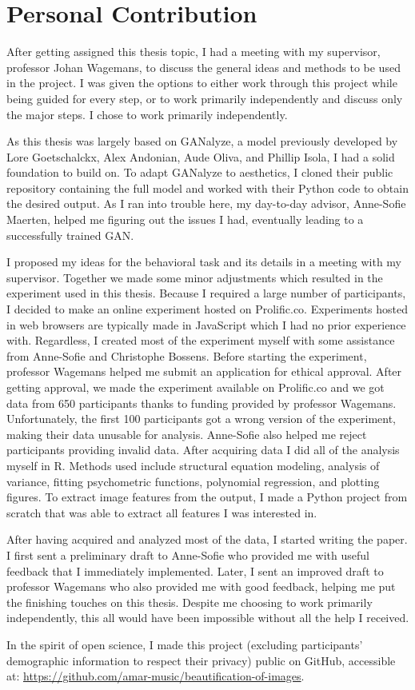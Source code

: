\documentclass[../main.tex]{subfiles}
\begin{document}
\newpage
\section{Personal Contribution}
After getting assigned this thesis topic, I had a meeting with my supervisor, professor Johan Wagemans, to discuss the general ideas and methods to be used in the project. I was given the options to either work through this project while being guided for every step, or to work primarily independently and discuss only the major steps. I chose to work primarily independently.

As this thesis was largely based on GANalyze, a model previously developed by Lore Goetschalckx, Alex Andonian, Aude Oliva, and Phillip Isola, I had a solid foundation to build on. To adapt GANalyze to aesthetics, I cloned their public repository containing the full model and worked with their Python code to obtain the desired output. As I ran into trouble here, my day-to-day advisor, Anne-Sofie Maerten, helped me figuring out the issues I had, eventually leading to a successfully trained GAN.

I proposed my ideas for the behavioral task and its details in a meeting with my supervisor. Together we made some minor adjustments which resulted in the experiment used in this thesis. Because I required a large number of participants, I decided to make an online experiment hosted on Prolific.co. Experiments hosted in web browsers are typically made in JavaScript which I had no prior experience with. Regardless, I created most of the experiment myself with some assistance from Anne-Sofie and Christophe Bossens. Before starting the experiment, professor Wagemans helped me submit an application for ethical approval. After getting approval, we made the experiment available on Prolific.co and we got data from 650 participants thanks to funding provided by professor Wagemans. Unfortunately, the first 100 participants got a wrong version of the experiment, making their data unusable for analysis. Anne-Sofie also helped me reject participants providing invalid data. After acquiring data I did all of the analysis myself in R. Methods used include structural equation modeling, analysis of variance, fitting psychometric functions, polynomial regression, and plotting figures. To extract image features from the output, I made a Python project from scratch that was able to extract all features I was interested in. 

After having acquired and analyzed most of the data, I started writing the paper. I first sent a preliminary draft to Anne-Sofie who provided me with useful feedback that I immediately implemented. Later, I sent an improved draft to professor Wagemans who also provided me with good feedback, helping me put the finishing touches on this thesis. Despite me choosing to work primarily independently, this all would have been impossible without all the help I received.

In the spirit of open science, I made this project (excluding participants' demographic information to respect their privacy) public on GitHub, accessible at: \newline \url{https://github.com/amar-music/beautification-of-images}.
\end{document}
